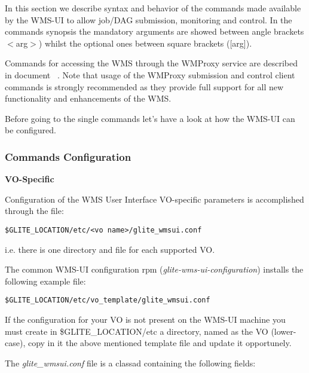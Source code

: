 
In this section we describe syntax and behavior of the commands made available by the WMS-UI to allow job/DAG 
submission, monitoring and control. In the commands synopsis the mandatory arguments are showed between 
angle brackets $<$arg$>$) whilst the optional ones between square brackets ([arg]).

Commands for accessing the WMS through the WMProxy service are described in document ~\cite{WMPROXY}.
Note that usage of the WMProxy submission and control client commands is strongly recommended as they 
provide full support for all new functionality and enhancements of the WMS. 

Before going to the single commands let's have a look at how the WMS-UI can be configured.


\medskip
\subsubsection{Commands Configuration}
\label{config}

\textbf{VO-Specific}

Configuration of the WMS User Interface VO-specific parameters is accomplished through the file:

\smallskip
\begin{verbatim}
$GLITE_LOCATION/etc/<vo name>/glite_wmsui.conf 
\end{verbatim}
\smallskip


i.e. there is one directory and file for each supported VO. 

The common WMS-UI configuration rpm (\textit{glite-wms-ui-configuration}) installs the following example file:

\smallskip
\begin{verbatim}
$GLITE_LOCATION/etc/vo_template/glite_wmsui.conf
\end{verbatim}
\smallskip

If the configuration for your VO is not present on the WMS-UI machine you must create in \$GLITE\_LOCATION/etc a 
directory, named as the VO (lower-case), copy in it the above mentioned template file and update it opportunely.

The \emph{glite\_wmsui.conf} file is a classad containing the following fields:

\smallskip

